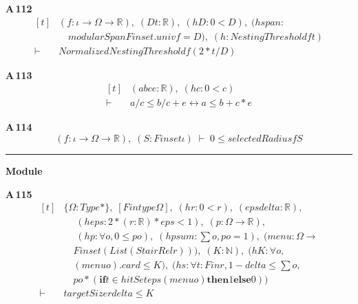 \noindent\textbf{A\,112}\quad{}
{\footnotesize\[ \begin{aligned}[t]
&(\mathit{f} : \iota \to \Omega \to \mathbb{R} ),\; (\mathit{D} \mathit{t} : \mathbb{R} ),\; (\mathit{hD} : 0 < \mathit{D}),\; (\mathit{hspan} :\\
&\quad \mathit{modularSpan} \mathit{Finset}.\mathit{univ} \mathit{f} = \mathit{D}),\; (\mathit{h} : \mathit{NestingThreshold} \mathit{f} \mathit{t})\\
\vdash\;&\mathit{NormalizedNestingThreshold} \mathit{f} (2 * \mathit{t} / \mathit{D})
\end{aligned} \]}

\noindent\textbf{A\,113}\quad{}
{\footnotesize\[ \begin{aligned}[t]
&(\mathit{a} \mathit{b} \mathit{c} \mathit{e} : \mathbb{R} ),\; (\mathit{hc} : 0 < \mathit{c})\\
\vdash\;&\mathit{a} / \mathit{c} \leq \mathit{b} / \mathit{c} + \mathit{e} \leftrightarrow \mathit{a} \leq \mathit{b} + \mathit{c} * \mathit{e}
\end{aligned} \]}

\noindent\textbf{A\,114}\quad{}
{\footnotesize\[ (\mathit{f} : \iota \to \Omega \to \mathbb{R} ),\; (\mathit{S} : \mathit{Finset} \iota ) \;\vdash\; 0 \leq \mathit{selectedRadius} \mathit{f} \mathit{S} \]}

\vspace{4pt}\noindent\rule{\columnwidth}{0.4pt}\par\vspace{2pt}
\noindent\textbf{Module }\par\vspace{3pt}

\noindent\textbf{A\,115}\quad{}
{\footnotesize\[ \begin{aligned}[t]
&\{ \Omega : \mathit{Type}*\},\; [\mathit{Fintype} \Omega ],\; (\mathit{hr} : 0<\mathit{r}),\; (\mathit{eps} \mathit{delta} : \mathbb{R} ),\\
&\quad \; (\mathit{heps} : 2*(\mathit{r} : \mathbb{R} )*\mathit{eps}<1),\; (\mathit{p} : \Omega \to \mathbb{R} ),\\
&\quad \; (\mathit{hp} : \forall \mathit{o},0 \leq \mathit{p} \mathit{o}),\; (\mathit{hpsum} : \textstyle\sum \mathit{o},\mathit{p} \mathit{o}=1),\; (\mathit{menu} : \Omega \to\\
&\quad \mathit{Finset} (\mathit{List} (\mathit{StairRel} \mathit{r}))),\; (\mathit{K} : \mathbb{N} ),\; (\mathit{hK} : \forall \mathit{o},\\
&\quad (\mathit{menu} \mathit{o}).\mathit{card} \leq \mathit{K}),\; (\mathit{hs} : \forall \mathit{t} : \mathit{Fin} \mathit{r},1-\mathit{delta} \leq \textstyle\sum \mathit{o},\\
&\quad \mathit{p} \mathit{o}*(\mathbf{if} \mathit{t} \in \mathit{hitSet} \mathit{eps} (\mathit{menu} \mathit{o}) \mathbf{then} 1 \mathbf{else} 0))\\
\vdash\;&\mathit{targetSize} \mathit{r} \mathit{delta} \leq \mathit{K}
\end{aligned} \]}

